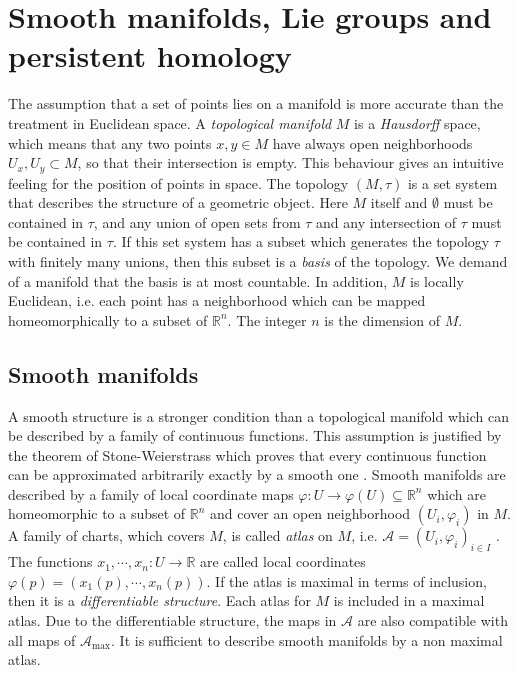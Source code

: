\documentclass[runningheads,orivec]{llncs}
\begin{document}
\section{Smooth manifolds, Lie groups and persistent homology}
The assumption that a set of points lies on a manifold is more accurate than the treatment in Euclidean space. A \emph{topological manifold} $M$ is a \emph{Hausdorff} space, which means that any two points $x,y \in M$ have always open neighborhoods $U_x,U_y \subset M$, so that their intersection is empty. This behaviour gives an intuitive feeling for the position of points in space. The topology $(M, \tau)$ is a set system that describes the structure of a geometric object. Here $M$ itself and $\emptyset$ must be contained in $\tau$, and any union of open sets from $\tau$ and any intersection of $\tau$ must be contained in $\tau$. If this set system has a subset which generates the topology $\tau$ with finitely many unions, then this subset is a \emph{basis} of the topology. We demand of a manifold that the basis is at most countable. In addition, $M$ is locally Euclidean, i.e. each point has a neighborhood which can be mapped homeomorphically to a subset of $\mathbb{R}^n$. The integer $n$ is the dimension of $M$. 

\subsection{Smooth manifolds}
A smooth structure is a stronger condition than a topological manifold which can be described by a family of continuous functions. This assumption is justified by the theorem of Stone-Weierstrass which proves that every continuous function can be approximated arbitrarily exactly by a smooth one \cite{stone1948generalized}. Smooth manifolds are described by a family of local coordinate maps $\varphi: U \rightarrow \varphi(U) \subseteq \mathbb{R}^n$ which are homeomorphic to a subset of $\mathbb{R}^{n}$ and cover an open neighborhood $(U_i,\varphi_i)$ in $M$. A family of charts, which covers $M$, is called \emph{atlas} on $M$, i.e. $\mathscr{A} = (U_i,\varphi_i)_{i \in I}$ \cite{lee2013smooth}. The functions $x_1, \cdots, x_n: U \rightarrow \mathbb{R}$ are called local coordinates $\varphi(p) = (x_1(p), \cdots, x_n(p))$. If the atlas is maximal in terms of inclusion, then it is a \emph{differentiable structure}. Each atlas for $M$ is included in a maximal atlas. Due to the differentiable structure, the maps in $\mathscr{A}$ are also compatible with all maps of $\mathscr{A}_{\text{max}}$. It is sufficient to describe smooth manifolds by a non maximal atlas.
\end{document}
